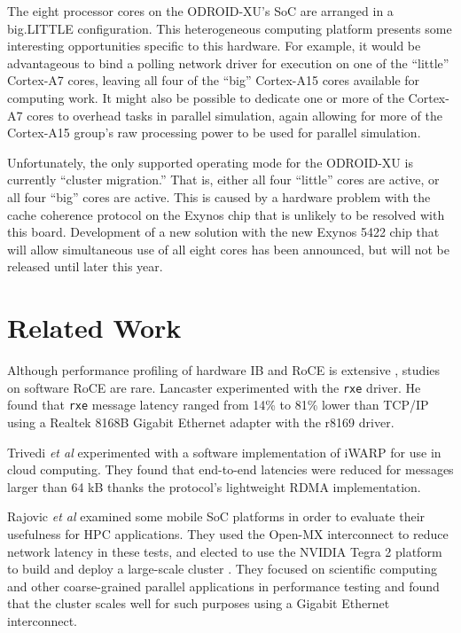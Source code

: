 \documentclass[11pt]{book}
\begin{document}
The eight processor cores on the ODROID-XU's SoC are arranged in a big.LITTLE
configuration.  This heterogeneous computing platform presents some interesting
opportunities specific to this hardware.  For example, it would be advantageous to bind a
polling network driver for execution on one of the ``little'' Cortex-A7 cores, leaving all
four of the ``big'' Cortex-A15 cores available for computing work.  It might also be
possible to dedicate one or more of the Cortex-A7 cores to overhead tasks in parallel
simulation, again allowing for more of the Cortex-A15 group's raw processing power to be
used for parallel simulation.  

Unfortunately, the only supported operating mode for the ODROID-XU is currently ``cluster
migration.''  That is, either all four ``little'' cores are active, or all four ``big''
cores are active.  This is caused by a hardware problem with the cache coherence protocol
on the Exynos chip that is unlikely to be resolved with this board.  Development of a new
solution with the new Exynos 5422 chip that will allow simultaneous use of all eight cores
has been announced, but will not be released until later this year.

\section{Related Work}

Although performance profiling of hardware IB and RoCE is extensive
\cite{subamaroni-09,vienne-12}, studies on software RoCE are rare.  Lancaster
\cite{lancaster-10} experimented with the \verb;rxe; driver.  He found that \verb;rxe;
message latency ranged from 14\% to 81\% lower than TCP/IP using a Realtek 8168B Gigabit
Ethernet adapter with the r8169 driver.

Trivedi \emph{et al} \cite{trivedi-11} experimented with a software implementation of
iWARP for use in cloud computing.  They found that end-to-end latencies were reduced for
messages larger than 64 kB thanks the protocol's lightweight RDMA implementation.


Rajovic \emph{et al} \cite{rajovic-13} examined some mobile SoC platforms in order to
evaluate their usefulness for HPC applications.  They used the Open-MX interconnect to
reduce network latency in these tests, and elected to use the NVIDIA Tegra 2 platform to
build and deploy a large-scale cluster \cite{rajovic-14}.  They focused on scientific
computing and other coarse-grained parallel applications in performance testing and found
that the cluster scales well for such purposes using a Gigabit Ethernet interconnect.
\end{document}
